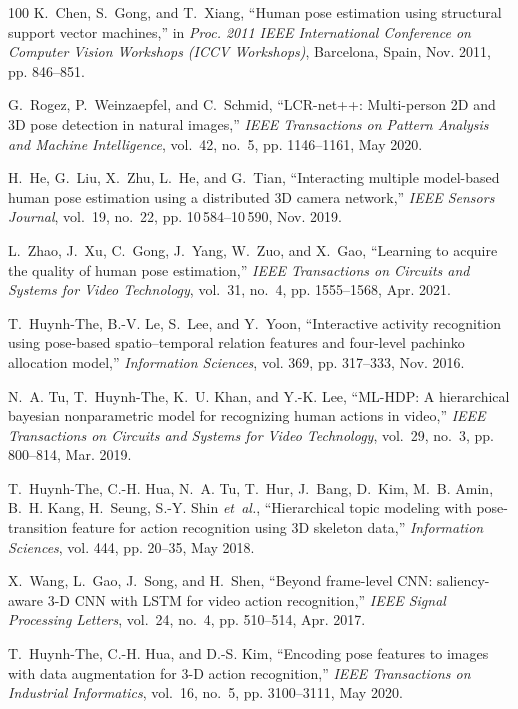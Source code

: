 \documentclass[journal]{IEEEtran}
\begin{document}
\begin{thebibliography}{100}
	K.~Chen, S.~Gong, and T.~Xiang, ``Human pose estimation using structural
	support vector machines,'' in \emph{Proc. 2011 IEEE International Conference
		on Computer Vision Workshops (ICCV Workshops)}, Barcelona, Spain, Nov. 2011,
	pp. 846--851.
	
	G.~Rogez, P.~Weinzaepfel, and C.~Schmid, ``{LCR-net++}: Multi-person {2D} and
	{3D} pose detection in natural images,'' \emph{IEEE Transactions on Pattern
		Analysis and Machine Intelligence}, vol.~42, no.~5, pp. 1146--1161, May 2020.
	
	H.~He, G.~Liu, X.~Zhu, L.~He, and G.~Tian, ``Interacting multiple model-based
	human pose estimation using a distributed {3D} camera network,'' \emph{IEEE
		Sensors Journal}, vol.~19, no.~22, pp. 10\,584--10\,590, Nov. 2019.
	
	L.~Zhao, J.~Xu, C.~Gong, J.~Yang, W.~Zuo, and X.~Gao, ``Learning to acquire the
	quality of human pose estimation,'' \emph{IEEE Transactions on Circuits and
		Systems for Video Technology}, vol.~31, no.~4, pp. 1555--1568, Apr. 2021.
	
	T.~Huynh-The, B.-V. Le, S.~Lee, and Y.~Yoon, ``Interactive activity recognition
	using pose-based spatio--temporal relation features and four-level pachinko
	allocation model,'' \emph{Information Sciences}, vol. 369, pp. 317--333, Nov.
	2016.
	
	N.~A. Tu, T.~Huynh-The, K.~U. Khan, and Y.-K. Lee, ``{ML-HDP}: A hierarchical
	bayesian nonparametric model for recognizing human actions in video,''
	\emph{IEEE Transactions on Circuits and Systems for Video Technology},
	vol.~29, no.~3, pp. 800--814, Mar. 2019.
	
	T.~Huynh-The, C.-H. Hua, N.~A. Tu, T.~Hur, J.~Bang, D.~Kim, M.~B. Amin, B.~H.
	Kang, H.~Seung, S.-Y. Shin \emph{et~al.}, ``Hierarchical topic modeling with
	pose-transition feature for action recognition using {3D} skeleton data,''
	\emph{Information Sciences}, vol. 444, pp. 20--35, May 2018.
	
	X.~Wang, L.~Gao, J.~Song, and H.~Shen, ``Beyond frame-level {CNN}:
	saliency-aware {3-D CNN} with {LSTM} for video action recognition,''
	\emph{IEEE Signal Processing Letters}, vol.~24, no.~4, pp. 510--514, Apr.
	2017.
	
	T.~Huynh-The, C.-H. Hua, and D.-S. Kim, ``Encoding pose features to images with
	data augmentation for {3-D} action recognition,'' \emph{IEEE Transactions on
		Industrial Informatics}, vol.~16, no.~5, pp. 3100--3111, May 2020.
	

\end{thebibliography}
\end{document}
